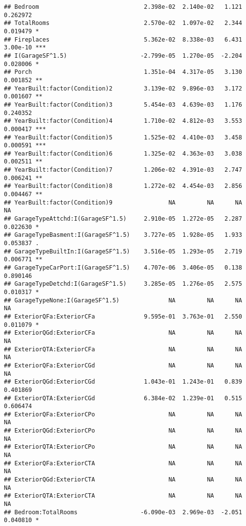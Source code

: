 \documentclass[
]{article}
\begin{document}
\begin{verbatim}
## Bedroom                              2.398e-02  2.140e-02   1.121 0.262972    
## TotalRooms                           2.570e-02  1.097e-02   2.344 0.019479 *  
## Fireplaces                           5.362e-02  8.338e-03   6.431 3.00e-10 ***
## I(GarageSF^1.5)                     -2.799e-05  1.270e-05  -2.204 0.028006 *  
## Porch                                1.351e-04  4.317e-05   3.130 0.001852 ** 
## YearBuilt:factor(Condition)2         3.139e-02  9.896e-03   3.172 0.001607 ** 
## YearBuilt:factor(Condition)3         5.454e-03  4.639e-03   1.176 0.240352    
## YearBuilt:factor(Condition)4         1.710e-02  4.812e-03   3.553 0.000417 ***
## YearBuilt:factor(Condition)5         1.525e-02  4.410e-03   3.458 0.000591 ***
## YearBuilt:factor(Condition)6         1.325e-02  4.363e-03   3.038 0.002511 ** 
## YearBuilt:factor(Condition)7         1.206e-02  4.391e-03   2.747 0.006241 ** 
## YearBuilt:factor(Condition)8         1.272e-02  4.454e-03   2.856 0.004467 ** 
## YearBuilt:factor(Condition)9                NA         NA      NA       NA    
## GarageTypeAttchd:I(GarageSF^1.5)     2.910e-05  1.272e-05   2.287 0.022630 *  
## GarageTypeBasment:I(GarageSF^1.5)    3.727e-05  1.928e-05   1.933 0.053837 .  
## GarageTypeBuiltIn:I(GarageSF^1.5)    3.516e-05  1.293e-05   2.719 0.006771 ** 
## GarageTypeCarPort:I(GarageSF^1.5)    4.707e-06  3.406e-05   0.138 0.890146    
## GarageTypeDetchd:I(GarageSF^1.5)     3.285e-05  1.276e-05   2.575 0.010317 *  
## GarageTypeNone:I(GarageSF^1.5)              NA         NA      NA       NA    
## ExteriorQFa:ExteriorCFa              9.595e-01  3.763e-01   2.550 0.011079 *  
## ExteriorQGd:ExteriorCFa                     NA         NA      NA       NA    
## ExteriorQTA:ExteriorCFa                     NA         NA      NA       NA    
## ExteriorQFa:ExteriorCGd                     NA         NA      NA       NA    
## ExteriorQGd:ExteriorCGd              1.043e-01  1.243e-01   0.839 0.401869    
## ExteriorQTA:ExteriorCGd              6.384e-02  1.239e-01   0.515 0.606474    
## ExteriorQFa:ExteriorCPo                     NA         NA      NA       NA    
## ExteriorQGd:ExteriorCPo                     NA         NA      NA       NA    
## ExteriorQTA:ExteriorCPo                     NA         NA      NA       NA    
## ExteriorQFa:ExteriorCTA                     NA         NA      NA       NA    
## ExteriorQGd:ExteriorCTA                     NA         NA      NA       NA    
## ExteriorQTA:ExteriorCTA                     NA         NA      NA       NA    
## Bedroom:TotalRooms                  -6.090e-03  2.969e-03  -2.051 0.040810 *  

\end{verbatim}
\end{document}
